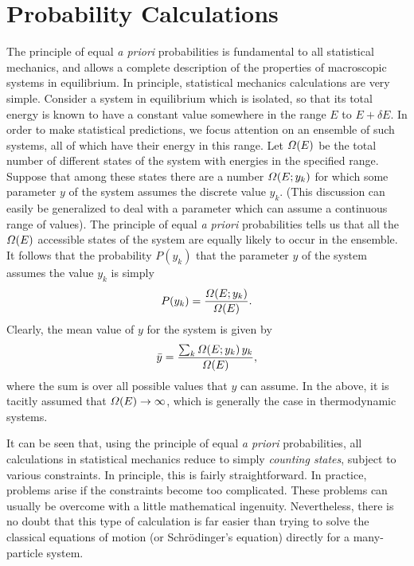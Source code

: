 \section{Probability Calculations}
The principle of equal {\em a priori}\/ probabilities is fundamental to all
statistical mechanics, and allows a complete description of the properties 
of macroscopic systems in equilibrium. In principle, 
statistical mechanics calculations are
very simple. Consider a system in equilibrium which is isolated, so that its
total energy is known to have a constant value somewhere in the range $E$ to
$E + \delta E$. In order to make statistical predictions, we focus attention
on an ensemble of such systems, all of which have their energy in this range.
Let ${\mit\Omega}(E)$ be the total number of different states of the system with 
energies in the specified range. Suppose that among these states there are
a number ${\mit\Omega}(E; y_k)$ for which some parameter $y$ of the system
assumes the discrete value $y_k$. (This discussion can easily
be generalized to deal with  a parameter which can assume a continuous range of
values). The principle of equal {\em a priori}\/ probabilities tells us
that all the ${\mit\Omega}(E)$ accessible states of the system are equally likely
to occur in the ensemble. It follows that the probability $P(y_k)$ that the
parameter $y$ of the system assumes the value $y_k$ is simply
\begin{equation}
P(y_k) = \frac{{\mit\Omega}(E; y_k)}{{\mit\Omega}(E)}.
\end{equation}
Clearly, the mean value of $y$ for the system is given by
\begin{equation}
\bar{y} = \frac{\sum_k {\mit\Omega}(E; y_k) \,y_k}{{\mit\Omega}(E)},
\end{equation}
where the sum is over all possible values that $y$ can assume.
In the above, it is tacitly assumed that ${\mit\Omega}(E)\rightarrow \infty$,
which is generally the case in thermodynamic systems.

It can be seen that, using  the principle of equal {\em a priori}
probabilities, all calculations in statistical mechanics
reduce to simply {\em counting states}, subject to
various constraints.  In principle, this is fairly straightforward.
In practice, problems  arise if
the constraints  become  too complicated. These problems can usually be
overcome with a little mathematical ingenuity. 
Nevertheless, there is no doubt that this
type of calculation is far easier than trying to  solve the classical equations
of motion 
(or Schr\"{o}dinger's equation) directly for a many-particle system.

